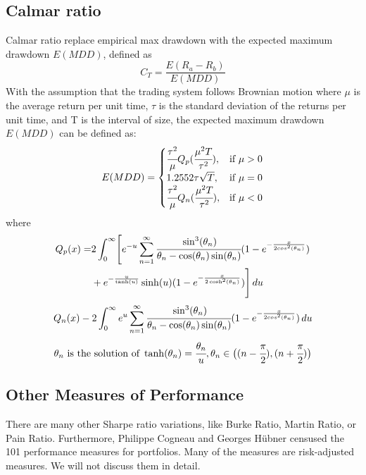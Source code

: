 \subsection{Calmar ratio}
Calmar ratio\cite{young1991calmar} replace empirical max drawdown with the expected maximum drawdown \(E(MDD)\), defined as 
\[C_T = \frac{E(R_a - R_b)}{E(MDD)}\]
With the assumption that the trading system follows Brownian motion where \(\mu\) is the average return per unit time, \(\tau\) is the standard deviation of the returns per unit time, and T is the interval of size, the expected maximum drawdown \(E(MDD)\) can be defined as\cite{1196267,pratap2004maximum}:
\[E(MDD)=
\begin{cases}
    \cfrac{\tau^2}{\mu}Q_p(\cfrac{\mu^2T}{\tau^2}),&\text{if  }\mu > 0\\
    1.2552 \tau \sqrt{T},& \text{if  }\mu=0 \\
    \cfrac{\tau^2}{\mu}Q_n(\cfrac{\mu^2T}{\tau^2}),&\text{if  }\mu <0
\end{cases}
\]
where
\[
\begin{aligned}
Q_p(x) = &2\int_0^\infty\Biggl[
    e^{-u}\sum_{n=1}^{\infty}
    \cfrac{\sin^3(\theta_n)}{\theta_n-\cos(\theta_n)\sin(\theta_n)}
    (1-e^{-\frac{x}{2cos^2(\theta_n)}})\\
    &+e^{-\frac{u}{\tanh(u)}}\sinh(u)
    (1-e^{-\frac{x}{2\cosh^2(\theta_n)}})
    \Biggr]\,du
\end{aligned}
\]
\[
Q_n(x)-2\int_0^\infty e^u \sum_{n=1}^{\infty}
\cfrac{\sin^3(\theta_n)}{\theta_n-\cos(\theta_n)\sin(\theta_n)}
(1-e^{-\frac{x}{2cos^2(\theta_n)}})
\,du
\]
\[
\theta_n \text{ is the solution of }
 \tanh(\theta_n) =\cfrac{\theta_n}{u},
 \theta_n \in \bigl( (n-\cfrac{\pi}{2}),(n+\cfrac{\pi}{2})\bigr)
\]

\subsection{Other Measures of Performance}
There are many other Sharpe ratio variations, like Burke Ratio, Martin Ratio, or Pain Ratio\cite{bacon2009sharp}. Furthermore, Philippe Cogneau and Georges Hübner censused the 101 performance measures for portfolios. Many of the measures are risk-adjusted measures.\cite{cogneau2009101}
We will not discuss them in detail.